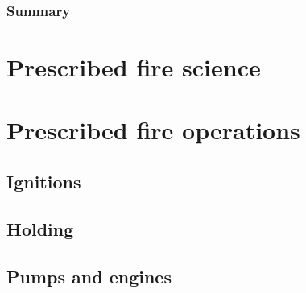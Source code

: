 \documentclass[twoside, 12pt]{tufte-book}
\begin{document}
 
%
%
\begin{titlepage} 
		
	\restoregeometry
\end{titlepage}
%
%
\thispagestyle{empty}
	\begin{mybox}{\section{Summary} \vspace{0.5cm}}
		{\parbox{\textwidth}{ 
			 
		}}
	\end{mybox}
\restoregeometry
%
%

%
%
	\tableofcontents
\restoregeometry
%
%
\part{Prescribed fire science}
	
	

\part{Prescribed fire operations}
	


\chapter{Ignitions} 
\chapter{Holding} 
\chapter{Pumps and engines} 

%
%
\clearpage
\begin{fullwidth} %
 

\end{fullwidth}
%
\end{document}
